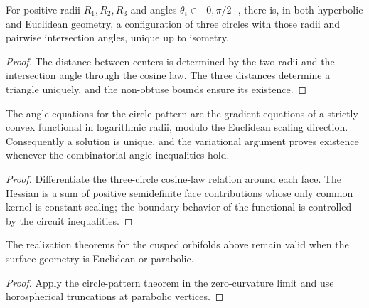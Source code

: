 \begin{lemma}
\label{thurston-ch13-three-circle-configuration}

For positive radii $R_1,R_2,R_3$ and angles
$\theta_i\in[0,\pi/2]$, there is, in both hyperbolic and Euclidean geometry,
a configuration of three circles with those radii and pairwise intersection
angles, unique up to isometry.
\end{lemma}
\begin{proof}
\sketch The distance between centers is determined by the two radii and the
intersection angle through the cosine law.  The three distances determine a
triangle uniquely, and the non-obtuse bounds ensure its existence.
\end{proof}

\begin{lemma}
\label{thurston-ch13-circle-pattern-convexity}

The angle equations for the circle pattern are the gradient equations of a
strictly convex functional in logarithmic radii, modulo the Euclidean scaling
direction.  Consequently a solution is unique, and the variational argument
proves existence whenever the combinatorial angle inequalities hold.
\end{lemma}
\begin{proof}
\sketch Differentiate the three-circle cosine-law relation around each face.
The Hessian is a sum of positive semidefinite face contributions whose only
common kernel is constant scaling; the boundary behavior of the functional is
controlled by the circuit inequalities.
\end{proof}

\begin{corollary}
\label{thurston-ch13-circle-pattern-euclidean}

The realization theorems for the cusped orbifolds above remain valid when the
surface geometry is Euclidean or parabolic.
\end{corollary}
\begin{proof}
\sketch Apply the circle-pattern theorem in the zero-curvature limit and use
horospherical truncations at parabolic vertices.
\end{proof}

